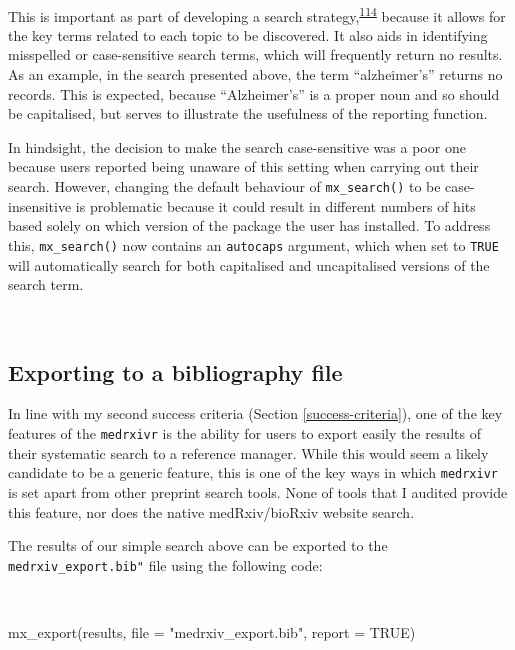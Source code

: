 \documentclass[a4paper, twoside]{templates/ociamthesis}
\newenvironment{Shaded}{\begin{snugshade}}{\end{snugshade}}
\newcommand{\AttributeTok}[1]{\textcolor[rgb]{0.77,0.63,0.00}{#1}}
\newcommand{\ConstantTok}[1]{\textcolor[rgb]{0.00,0.00,0.00}{#1}}
\newcommand{\FunctionTok}[1]{\textcolor[rgb]{0.00,0.00,0.00}{#1}}
\newcommand{\NormalTok}[1]{#1}
\newcommand{\StringTok}[1]{\textcolor[rgb]{0.31,0.60,0.02}{#1}}
\renewenvironment{Shaded}
{
  \vspace{4pt}%
  \begin{snugshade}%
}{%
  \end{snugshade}%
  \vspace{4pt}%
}
\begin{document}
~

This is important as part of developing a search strategy,\textsuperscript{\protect\hyperlink{ref-bramer2018}{114}} because it allows for the key terms related to each topic to be discovered. It also aids in identifying misspelled or case-sensitive search terms, which will frequently return no results. As an example, in the search presented above, the term ``alzheimer's'' returns no records. This is expected, because ``Alzheimer's'' is a proper noun and so should be capitalised, but serves to illustrate the usefulness of the reporting function.

In hindsight, the decision to make the search case-sensitive was a poor one because users reported being unaware of this setting when carrying out their search. However, changing the default behaviour of \texttt{mx\_search()} to be case-insensitive is problematic because it could result in different numbers of hits based solely on which version of the package the user has installed. To address this, \texttt{mx\_search()} now contains an \texttt{autocaps} argument, which when set to \texttt{TRUE} will automatically search for both capitalised and uncapitalised versions of the search term.

~

\hypertarget{exporting-to-a-bibliography-file}{%
\subsection{Exporting to a bibliography file}\label{exporting-to-a-bibliography-file}}

In line with my second success criteria (Section \ref{success-criteria}), one of the key features of the \texttt{medrxivr} is the ability for users to export easily the results of their systematic search to a reference manager. While this would seem a likely candidate to be a generic feature, this is one of the key ways in which \texttt{medrxivr} is set apart from other preprint search tools. None of tools that I audited provide this feature, nor does the native medRxiv/bioRxiv website search.

The results of our simple search above can be exported to the \texttt{medrxiv\_export.bib"} file using the following code:

~

\begin{Shaded}
\begin{Highlighting}[]
\FunctionTok{mx\_export}\NormalTok{(results, }
          \AttributeTok{file =} \StringTok{"medrxiv\_export.bib"}\NormalTok{,}
          \AttributeTok{report =} \ConstantTok{TRUE}\NormalTok{)}
\end{Highlighting}
\end{Shaded}
\end{document}
